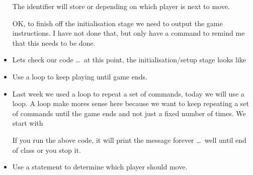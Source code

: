 \documentclass{coderdojo}
\begin{document}
\begin{itemize}


The identifier  will store  or  depending on which player is next to move.

OK, to finish off the initialisation stage we need to output the game instructions.  I have not done that, but only have a  command to remind me that this needs to be done.

\item[\color{section!70!black}\larger\ding{52}]
Lets check our code \ldots\ at this point, the initialisation/setup stage looks like 



\item[\color{section!70!black}\larger\ding{43}] Use a  loop to keep playing until game ends.

\item[\color{section!70!black}\larger\ding{43}]  Last week we used a  loop to repeat a set of commands, today we will use a  loop. A  loop make mores sense here because we want to keep repeating a set of commands until the game ends and not just a fixed number of times. We start with



If you run the above code, it will print the message forever \ldots\ well until end of class or you stop it.

\item[\color{section!70!black}\larger\ding{43}] Use a  statement to determine which player should move.



\end{itemize}
\end{document}

